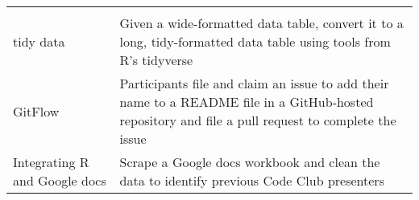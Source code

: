 \documentclass[11pt,]{article}
\begin{document}
\begin{longtable}[]{@{}ll@{}}
\begin{minipage}[t]{0.61\columnwidth}
\end{minipage}\tabularnewline
\begin{minipage}[t]{0.24\columnwidth}\raggedright\strut
tidy data\strut
\end{minipage} & \begin{minipage}[t]{0.61\columnwidth}\raggedright\strut
Given a wide-formatted data table, convert it to a long, tidy-formatted
data table using tools from R's tidyverse\strut
\end{minipage}\tabularnewline
\begin{minipage}[t]{0.24\columnwidth}\raggedright\strut
GitFlow\strut
\end{minipage} & \begin{minipage}[t]{0.61\columnwidth}\raggedright\strut
Participants file and claim an issue to add their name to a README file
in a GitHub-hosted repository and file a pull request to complete the
issue\strut
\end{minipage}\tabularnewline
\begin{minipage}[t]{0.24\columnwidth}\raggedright\strut
Integrating R and Google docs\strut
\end{minipage} & \begin{minipage}[t]{0.61\columnwidth}\raggedright\strut
Scrape a Google docs workbook and clean the data to identify previous
Code Club presenters\strut
\end{minipage}\tabularnewline
\bottomrule
\end{longtable}
\end{document}
